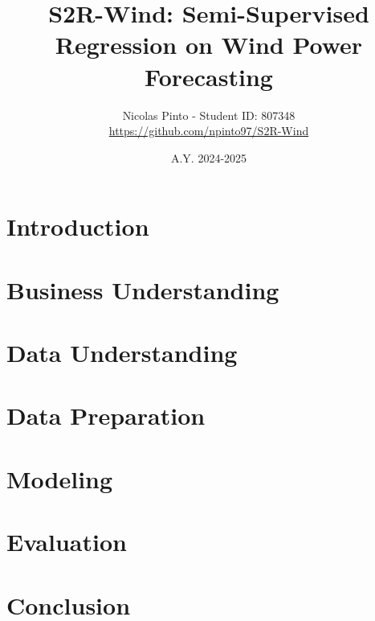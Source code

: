 \documentclass{article}
\title{S2R-Wind: Semi-Supervised Regression on Wind Power Forecasting}
\author{Nicolas Pinto - Student ID: 807348 \\\href{https://github.com/npinto97/S2R-Wind}{https://github.com/npinto97/S2R-Wind}}
\date{A.Y. 2024-2025}
\begin{document}
\maketitle

\section{Introduction}


\section{Business Understanding}


\section{Data Understanding}


\section{Data Preparation}


\section{Modeling}


\section{Evaluation}


% 

\section{Conclusion}

\end{document}
